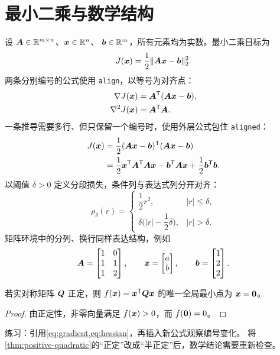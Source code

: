 \section{最小二乘与数学结构}\label{sec:math}
设 \(\bm{A}\in\mathbb{R}^{m\times n}\)、\(\bm{x}\in\mathbb{R}^n\)、
\(\bm{b}\in\mathbb{R}^m\)，所有元素均为实数。最小二乘目标为
\begin{equation}
  J(\bm{x})=\frac{1}{2}\lVert\bm{A}\bm{x}-\bm{b}\rVert_2^2.
  \label{eq:least-squares}
\end{equation}
两条分别编号的公式使用 \texttt{align}，以等号为对齐点：
\begin{align}
  \nabla J(\bm{x})&=\bm{A}^{\mathsf{T}}
    (\bm{A}\bm{x}-\bm{b}),\label{eq:gradient}\\
  \nabla^2J(\bm{x})&=\bm{A}^{\mathsf{T}}\bm{A}.
    \label{eq:hessian}
\end{align}
一条推导需要多行、但只保留一个编号时，使用外层公式包住 \texttt{aligned}：
\begin{equation}
  \begin{aligned}
    J(\bm{x})
      &=\frac{1}{2}(\bm{A}\bm{x}-\bm{b})^{\mathsf{T}}
        (\bm{A}\bm{x}-\bm{b})\\
      &=\frac{1}{2}\bm{x}^{\mathsf{T}}\bm{A}^{\mathsf{T}}
        \bm{A}\bm{x}
        -\bm{b}^{\mathsf{T}}\bm{A}\bm{x}
        +\frac{1}{2}\bm{b}^{\mathsf{T}}\bm{b}.
  \end{aligned}
  \label{eq:expanded-loss}
\end{equation}
以阈值 \(\delta>0\) 定义分段损失，条件列与表达式列分开对齐：
\begin{equation}
  \rho_\delta(r)=
  \begin{cases}
    \dfrac{1}{2}r^2,&\lvert r\rvert\leq\delta,\\
    \delta\bigl(\lvert r\rvert-\dfrac{1}{2}\delta\bigr),
      &\lvert r\rvert>\delta.
  \end{cases}
  \label{eq:huber}
\end{equation}
矩阵环境中的分列、换行同样表达结构，例如
\[
  \bm{A}=\begin{bmatrix}1&0\\1&1\\1&2\end{bmatrix},
  \qquad
  \bm{x}=\begin{bmatrix}a\\b\end{bmatrix},
  \qquad
  \bm{b}=\begin{bmatrix}1\\2\\2\end{bmatrix}.
\]
\begin{theorem}[正定二次型]\label{thm:positive-quadratic}
若实对称矩阵 \(\bm{Q}\) 正定，则
\(f(\bm{x})=\bm{x}^{\mathsf{T}}\bm{Q}\bm{x}\)
的唯一全局最小点为 \(\bm{x}=\bm{0}\)。
\end{theorem}
\begin{proof}
由正定性，非零向量满足 \(f(\bm{x})>0\)，而 \(f(\bm{0})=0\)。
\end{proof}
练习：引用\cref{eq:gradient,eq:hessian}，再插入新公式观察编号变化。
将\cref{thm:positive-quadratic}的“正定”改成“半正定”后，数学结论需要重新检查。
